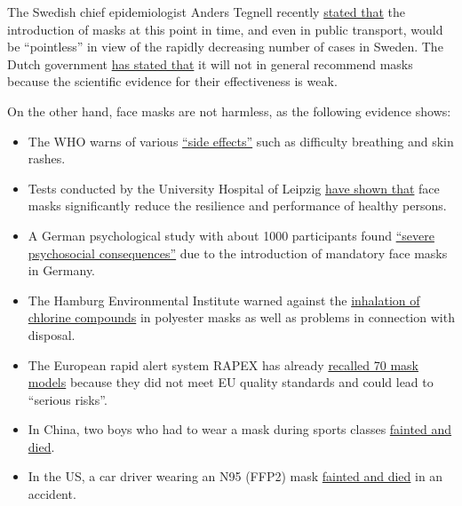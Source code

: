 The Swedish chief epidemiologist Anders Tegnell recently
\href{https://www.bloomberg.com/news/articles/2020-07-28/sweden-unveils-promising-covid-19-data-as-new-cases-plunge}{stated
that} the introduction of masks at this point in time, and even in
public transport, would be ``pointless'' in view of the rapidly
decreasing number of cases in Sweden. The Dutch government
\href{https://www.reuters.com/article/us-health-coronavirus-netherlands-idUSKCN24U2UJ}{has
stated that} it will not in general recommend masks because the
scientific evidence for their effectiveness is weak.

On the other hand, face masks are not harmless, as the following
evidence shows:

\begin{itemize}
\tightlist
\item
  The WHO warns of various
  \href{https://www.who.int/publications/i/item/advice-on-the-use-of-masks-in-the-community-during-home-care-and-in-healthcare-settings-in-the-context-of-the-novel-coronavirus-(2019-ncov)-outbreak}{``side
  effects''} such as difficulty breathing and skin rashes.
\item
  Tests conducted by the University Hospital of Leipzig
  \href{https://science.orf.at/stories/3201213/}{have shown that} face
  masks significantly reduce the resilience and performance of healthy
  persons.
\item
  A German psychological study with about 1000 participants found
  \href{https://corona-transition.org/der-maskenzwang-ist-verantwortlich-fur-schwere-psychische-schaden-und-die}{``severe
  psychosocial consequences''} due to the introduction of mandatory face
  masks in Germany.
\item
  The Hamburg Environmental Institute warned against the
  \href{https://corona-transition.org/maskentragen-noch-ungesunder-als-gedacht}{inhalation
  of chlorine compounds} in polyester masks as well as problems in
  connection with disposal.
\item
  The European rapid alert system RAPEX has already
  \href{https://corona-transition.org/maskentragen-noch-ungesunder-als-gedacht}{recalled
  70 mask models} because they did not meet EU quality standards and
  could lead to ``serious risks''.
\item
  In China, two boys who had to wear a mask during sports classes
  \href{https://www.ibtimes.com/2-chinese-boys-wearing-masks-during-gym-class-dropped-dead-reports-say-2971556}{fainted
  and died}.
\item
  In the US, a car driver wearing an N95 (FFP2) mask
  \href{https://nypost.com/2020/04/24/driver-crashes-car-after-passing-out-from-wearing-n95-mask/}{fainted
  and died} in an accident.
\end{itemize}

